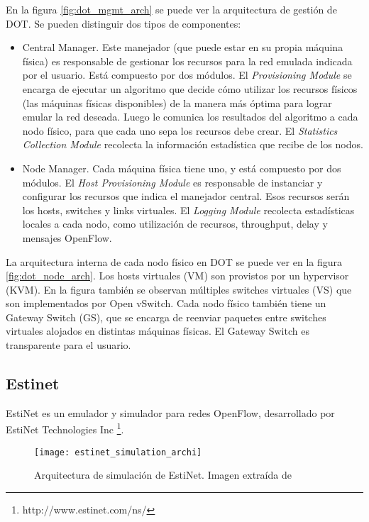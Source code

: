 En la figura \ref{fig:dot_mgmt_arch} se puede ver la arquitectura de gestión de DOT. Se pueden distinguir dos tipos de componentes:
\begin{itemize}
	\item Central Manager. Este manejador (que puede estar en su propia máquina física) es responsable de gestionar los recursos para la red emulada indicada por el usuario. Está compuesto por dos módulos. El \textit{Provisioning Module} se encarga de ejecutar un algoritmo que decide cómo utilizar los recursos físicos (las máquinas físicas disponibles) de la manera más óptima para lograr emular la red deseada. Luego le comunica los resultados del algoritmo a cada nodo físico, para que cada uno sepa los recursos debe crear. El \textit{Statistics Collection Module} recolecta la información estadística que recibe de los nodos.
	\item Node Manager. Cada máquina física tiene uno, y está compuesto por dos módulos. El \textit{Host Provisioning Module} es responsable de instanciar y configurar los recursos que indica el manejador central. Esos recursos serán los hosts, switches y links virtuales. El \textit{Logging Module} recolecta estadísticas locales a cada nodo, como utilización de recursos, throughput, delay y mensajes OpenFlow.
\end{itemize}

La arquitectura interna de cada nodo físico en DOT se puede ver en la figura \ref{fig:dot_node_arch}. Los hosts virtuales (VM) son provistos por un hypervisor (KVM). En la figura también se observan múltiples switches virtuales (VS) que son implementados por Open vSwitch. Cada nodo físico también tiene un Gateway Switch (GS), que se encarga de reenviar paquetes entre switches virtuales alojados en distintas máquinas físicas. El Gateway Switch es transparente para el usuario.

\subsection{Estinet}
EstiNet \cite{estinet} es un emulador y simulador para redes OpenFlow, desarrollado por EstiNet Technologies Inc \footnote{http://www.estinet.com/ns/}.

\begin{figure}[H]
	\caption{Arquitectura de simulación de EstiNet. Imagen extraída de \cite{estinet}}
	\texttt{[image: estinet\_simulation\_archi]}
	\centering
	\label{fig:estinet_simulation_archi}
\end{figure}

